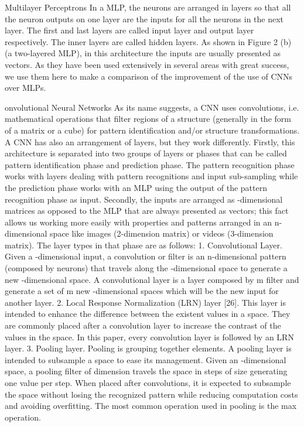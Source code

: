 Multilayer Perceptrons
In a MLP, the neurons are arranged in layers so that all the neuron outputs on one layer are the inputs for all the neurons in the next layer. The first and last layers are called input layer and output layer respectively. The inner layers are called hidden layers. As shown in Figure 2 (b) (a two-layered MLP), in this architecture the inputs are usually presented as vectors. As they have been used extensively in several areas with great success, we use them here to make a comparison of the improvement of the use of CNNs over MLPs.

onvolutional Neural Networks
As its name suggests, a CNN uses convolutions, i.e. mathematical operations that filter regions of a structure (generally in the form of a matrix or a cube) for pattern identification and/or structure transformations.
A CNN has also an arrangement of layers, but they work differently. Firstly, this architecture is separated into two groups of layers or phases that can be called pattern identification phase and prediction phase. The pattern recognition phase works with layers dealing with pattern recognitions and input sub-sampling while the prediction phase works with an MLP using the output of the pattern recognition phase as input. Secondly, the inputs are arranged as -dimensional matrices as opposed to the MLP that are always presented as vectors; this fact allows us working more easily with properties and patterns arranged in an n-dimensional space like images (2-dimension matrix) or videos (3-dimension matrix). The layer types in that phase are as follows:
1. Convolutional Layer. Given a -dimensional input, a convolution or filter is an n-dimensional pattern (composed by neurons) that travels along the -dimensional space to generate a new -dimensional space. A convolutional layer is a layer composed by m filter and generate a set of m new -dimensional spaces which will be the new input for another layer.
2. Local Response Normalization (LRN) layer [26]. This layer is intended to enhance the difference between the existent values in a space. They are commonly placed after a convolution layer to increase the contrast of the values in the space. In this paper, every convolution layer is followed by an LRN layer.
3. Pooling layer. Pooling is grouping together elements. A pooling layer is intended to subsample a space to ease its management. Given an -dimensional space, a pooling filter of dimension  travels the space in steps of size  generating one value per step. When placed after convolutions, it is expected to subsample the space without losing the recognized pattern while reducing computation costs and avoiding overfitting. The most common operation used in pooling is the max operation.



